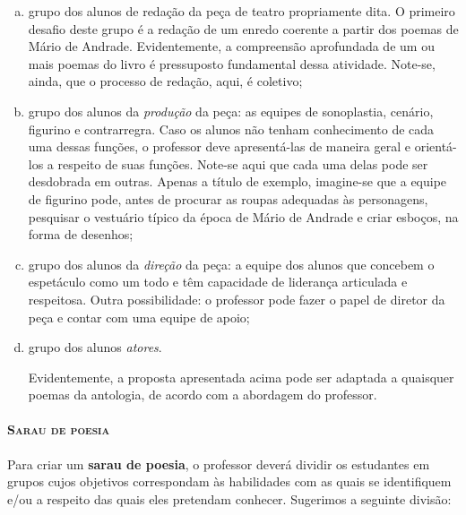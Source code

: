\documentclass[11pt]{extarticle}
\begin{document}
\begin{enumerate}[(a)]
 
\item grupo dos alunos de redação da peça de teatro propriamente dita. O
primeiro desafio deste grupo é a redação de um enredo coerente a partir
dos poemas de Mário de Andrade. Evidentemente, a compreensão aprofundada
de um ou mais poemas do livro é pressuposto fundamental dessa atividade.
Note-se, ainda, que o processo de redação, aqui, é coletivo;

\item grupo dos alunos da \emph{produção} da peça: as equipes de
sonoplastia, cenário, figurino e contrarregra. Caso os alunos não tenham
conhecimento de cada uma dessas funções, o professor deve apresentá-las
de maneira geral e orientá-los a respeito de suas funções. Note-se aqui
que cada uma delas pode ser desdobrada em outras. Apenas a título de
exemplo, imagine-se que a equipe de figurino pode, antes de procurar as
roupas adequadas às personagens, pesquisar o vestuário típico da época
de Mário de Andrade e criar esboços, na forma de desenhos;

\item grupo dos alunos da \emph{direção} da peça: a equipe dos alunos que
concebem o espetáculo como um todo e têm capacidade de liderança
articulada e respeitosa. Outra possibilidade: o professor pode fazer o
papel de diretor da peça e contar com uma equipe de apoio;

\item grupo dos alunos \emph{atores}.

Evidentemente, a proposta apresentada acima pode ser adaptada a
quaisquer poemas da antologia, de acordo com a abordagem do professor.
\end{enumerate}

\paragraph{\textsc{Sarau de poesia}}

Para criar um \textbf{sarau de poesia}, o professor deverá dividir os
estudantes em grupos cujos objetivos correspondam às habilidades com as
quais se identifiquem e/ou a respeito das quais eles pretendam conhecer.
Sugerimos a seguinte divisão:
\end{document}
